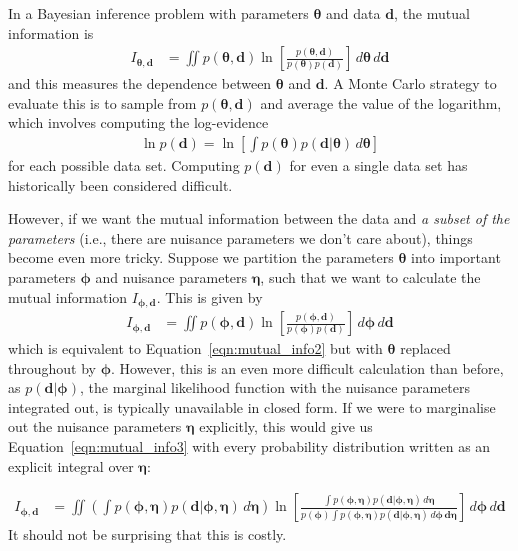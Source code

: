 \documentclass[entropy,article,accept,oneauthor,pdftex,10pt,a4paper]{mdpi}
\renewcommand{\d}{\boldsymbol{d}}
\newcommand{\x}{\boldsymbol{\theta}}
\newcommand{\bphi}{\boldsymbol{\phi}}
\newcommand{\boldeta}{\boldsymbol{\eta}}
\begin{document}
In a Bayesian inference problem with parameters $\x$ and data $\d$, the
mutual information is
\begin{align}
I_{\x, \d} &= \iint p(\x, \d)
                        \ln \left[\frac{p(\x, \d)}{p(\x)p(\d)}\right]
                        \, d\x \, d\d \label{eqn:mutual_info2}
\end{align}
and this measures the dependence between $\x$ and $\d$. A
Monte Carlo
strategy to evaluate this is to sample from $p(\x, \d)$ and average
the value of the logarithm, which involves computing the log-evidence
\begin{align}
\ln p(\d) = \ln\left[\int p(\x)p(\d | \x) \, d\x\right]
\end{align}
for each possible data set.
Computing $p(\d)$ for even a single
data set has historically been considered difficult.

However, if we want the mutual information between the data and
{\em a subset of the parameters} (i.e., there are nuisance parameters
we don't care about), things become even more tricky. Suppose we
partition the parameters $\x$ into important parameters
$\bphi$ and nuisance parameters $\boldeta$, such that we want to calculate
the mutual information $I_{\bphi, \d}$. This is given by
\begin{align}
I_{\bphi, \d} &= \iint p(\bphi, \d)
                        \ln \left[\frac{p(\bphi, \d)}{p(\bphi)p(\d)}\right]
                        \, d\bphi \, d\d \label{eqn:mutual_info3}
\end{align}
which is equivalent to Equation~\ref{eqn:mutual_info2} but with
$\x$ replaced throughout by $\bphi$. However, this is an even more
difficult calculation than before, as $p(\d | \bphi)$, the marginal likelihood
function with the nuisance parameters integrated out, is typically
unavailable in closed form. If we were to marginalise out the nuisance
parameters $\boldeta$ explicitly, this would give us
Equation~\ref{eqn:mutual_info3} with every probability distribution
written as an explicit integral over $\boldeta$:

\begin{align}
I_{\bphi, \d} &= \iint
  \left(\int p(\bphi, \boldeta)p(\d | \bphi, \boldeta) \, d\boldeta\right)
                        \ln \left[
  \frac{\int p(\bphi, \boldeta)p(\d | \bphi, \boldeta) \, d\boldeta}
{p(\bphi)\int p(\bphi, \boldeta)p(\d | \bphi, \boldeta) \, d\bphi \, \d\boldeta}\right]
                        \, d\bphi \, d\d
\end{align}
It should not be surprising that this is costly.
\end{document}
